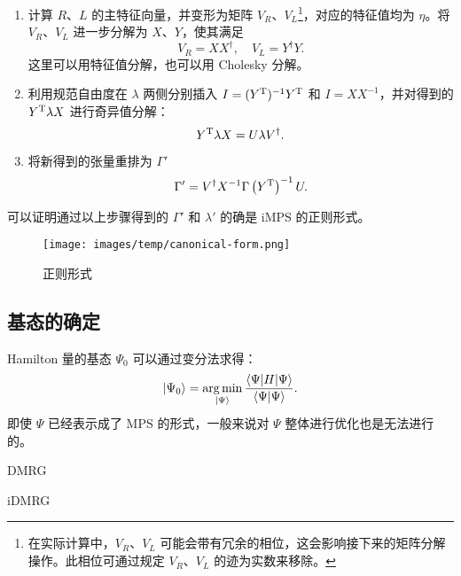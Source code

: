 \begin{enumerate}
  \item 计算 $R$、$L$ 的主特征向量，并变形为矩阵 $V_R$、$V_L$\footnote{在实际计算中，$V_R$、$V_L$ 可能会带有冗余的相位，这会影响接下来的矩阵分解操作。此相位可通过规定 $V_R$、$V_L$ 的迹为实数来移除。}，对应的特征值均为 $\eta$。将 $V_R$、$V_L$ 进一步分解为 $X$、$Y$，使其满足
    \begin{equation}
      V_R = X X^\dagger, \quad V_L = Y^\dagger Y.
    \end{equation}
    这里可以用特征值分解，也可以用 Cholesky 分解。

  \item 利用规范自由度在 $\lambda$ 两侧分别插入 $I=(Y^{\mathrm{T}})^{-1}Y^{\mathrm{T}}$ 和 $I=XX^{-1}$，并对得到的 $Y^{\mathrm{T}}\lambda X$ 进行奇异值分解：
    \begin{equation}
      Y^{\mathrm{T}} \lambda X = U \lambda V^\dagger.
    \end{equation}

  \item 将新得到的张量重排为 $\Gamma'$
    \begin{equation}
      \Gamma' = V^\dagger X^{-1} \Gamma \left( Y^{\mathrm{T}} \right)^{-1} U.
    \end{equation}
\end{enumerate}

可以证明通过以上步骤得到的 $\Gamma'$ 和 $\lambda'$ 的确是 iMPS 的正则形式。

\begin{figure}[htb]
  \centering
  \texttt{[image: images/temp/canonical-form.png]}
  \caption{正则形式}
  \label{fig:mps-canonical-form}
\end{figure}

\subsection{基态的确定}

Hamilton 量的基态 $\Psi_0$ 可以通过变分法求得：
\begin{equation}
  \ket{\Psi_0} = \argmin_{\ket{\Psi}} \frac{\langle\Psi|H|\Psi\rangle}{\langle\Psi|\Psi\rangle}.
\end{equation}
即使 $\Psi$ 已经表示成了 MPS 的形式，一般来说对 $\Psi$ 整体进行优化也是无法进行的。

DMRG\cite{white1992density,white1993density,schollwock2005density,mcculloch2007density,schollwock2011density}

iDMRG\cite{mcculloch2008infinite}


